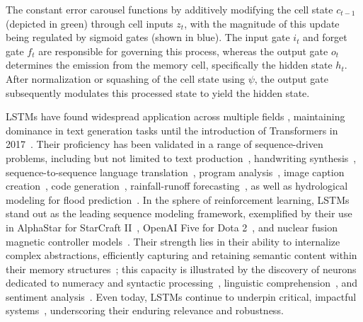 The constant error carousel functions by additively modifying the cell state $c_{t-1}$ (depicted in green) through cell inputs $z_t$, with the magnitude of this update being regulated by sigmoid gates (shown in blue). The input gate $i_t$ and forget gate $f_t$ are responsible for governing this process, whereas the output gate $o_t$ determines the emission from the memory cell, specifically the hidden state $h_t$. After normalization or squashing of the cell state using $\psi$, the output gate subsequently modulates this processed state to yield the hidden state.

LSTMs have found widespread application across multiple fields \citep{Hochreiter:01,Hochreiter:07,Schmidhuber:15}, maintaining dominance in text generation tasks until the introduction of Transformers in 2017~\citep{Vaswani:17}. Their proficiency has been validated in a range of sequence-driven problems, including but not limited to text production~\citep{Graves:13,Karpathy:15blog}, handwriting synthesis~\citep{Graves:13}, sequence-to-sequence language translation~\citep{Sutskever:14nips}, program analysis~\citep{Zaremba:14arxiv}, image caption creation~\citep{Karpathy:15,Hossain:19}, code generation~\citep{Karpathy:15blog}, rainfall-runoff forecasting~\citep{Kratzert:18,Kratzert:19}, as well as hydrological modeling for flood prediction~\citep{Nearing:24}. In the sphere of reinforcement learning, LSTMs stand out as the leading sequence modeling framework, exemplified by their use in AlphaStar for StarCraft II~\citep{Vinyals:17short}, OpenAI Five for Dota 2~\citep{OpenAI:19}, and nuclear fusion magnetic controller models~\citep{Degrave:22short}. Their strength lies in their ability to internalize complex abstractions, efficiently capturing and retaining semantic content within their memory structures~\citep{Karpathy:15blog}; this capacity is illustrated by the discovery of neurons dedicated to numeracy and syntactic processing~\citep{Lakretz:19}, linguistic comprehension~\citep{Bau:19}, and sentiment analysis~\citep{Radford:17arxiv}. Even today, LSTMs continue to underpin critical, impactful systems~\citep{Degrave:22short,Nearing:24}, underscoring their enduring relevance and robustness.

